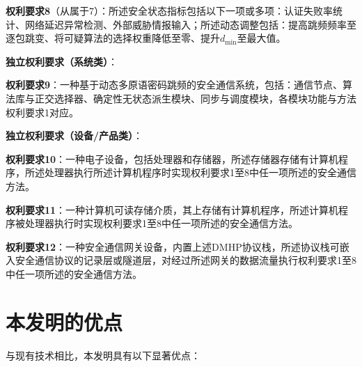 ﻿\documentclass[12pt,a4paper]{article}
\begin{document}
\textbf{权利要求8}（从属于7）：所述安全状态指标包括以下一项或多项：认证失败率统计、网络延迟异常检测、外部威胁情报输入；所述动态调整包括：提高跳频频率至逐包跳变、将可疑算法的选择权重降低至零、提升$d_{\min}$至最大值。

\textbf{独立权利要求（系统类）}：

\textbf{权利要求9}：一种基于动态多原语密码跳频的安全通信系统，包括：通信节点、算法库与正交选择器、确定性无状态派生模块、同步与调度模块，各模块功能与方法权利要求1对应。

\textbf{独立权利要求（设备/产品类）}：

\textbf{权利要求10}：一种电子设备，包括处理器和存储器，所述存储器存储有计算机程序，所述处理器执行所述计算机程序时实现权利要求1至8中任一项所述的安全通信方法。

\textbf{权利要求11}：一种计算机可读存储介质，其上存储有计算机程序，所述计算机程序被处理器执行时实现权利要求1至8中任一项所述的安全通信方法。

\textbf{权利要求12}：一种安全通信网关设备，内置上述DMHP协议栈，所述协议栈可嵌入安全通信协议的记录层或隧道层，对经过所述网关的数据流量执行权利要求1至8中任一项所述的安全通信方法。

\section{本发明的优点}

与现有技术相比，本发明具有以下显著优点：
\end{document}
